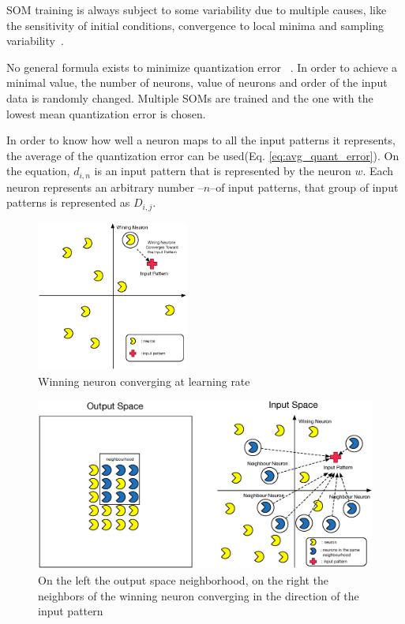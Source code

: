 SOM training is always subject to some variability due to multiple causes, like the sensitivity of initial conditions, convergence to local minima and sampling variability~\cite{Bodt}.

No general formula exists to minimize quantization error~\cite{Bodt} . In order to achieve a minimal value, the number of neurons, value of neurons and order of the input data is randomly changed. Multiple SOMs are trained and the one with the lowest mean quantization error is chosen.

In order to know how well a neuron maps to all the input patterns it represents, the average of the quantization error can be used(Eq. \ref{eq:avg_quant_error}). On the equation, $d_{i,n}$ is an input pattern that is represented by the neuron $w$. Each neuron represents an arbitrary number --$n$--of input patterns, that group of input patterns is represented as $D_{i,j}$.
\par






\begin{figure}
  \begin{center}
    \includegraphics[width=5cm]{images/4_wining_neuron_converge.eps}
  \end{center}
  \caption{ Winning neuron converging at learning rate }
  \label{fig:4_wining_neuron_converge}
\end{figure}

\begin{figure}
  \begin{center}
    \includegraphics[width=12cm]{images/5_neighbours_converge.eps}
  \end{center}
  \caption{ On the left the output space neighborhood, on the right the neighbors of the winning neuron converging in the direction of the input pattern }
  \label{fig:5_neighbours_converge}
\end{figure}

